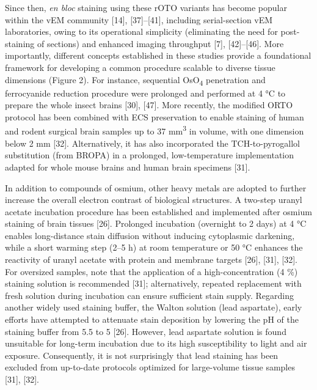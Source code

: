 \documentclass{article}
\begin{document}
Since then, \emph{en bloc} staining using these rOTO variants has become popular within the vEM community [14], [37]–[41], including serial-section vEM laboratories, owing to its operational simplicity (eliminating the need for post-staining of sections) and enhanced imaging throughput [7], [42]–[46]. More importantly, different concepts established in these studies provide a foundational framework for developing a common procedure scalable to diverse tissue dimensions (Figure 2). For instance, sequential OsO\textsubscript{4} penetration and ferrocyanide reduction procedure were prolonged and performed at 4 °C to prepare the whole insect brains [30], [47]. More recently, the modified ORTO protocol has been combined with ECS preservation to enable staining of human and rodent surgical brain samples up to 37 mm\textsuperscript{3} in volume, with one dimension below 2 mm [32]. Alternatively, it has also incorporated the TCH-to-pyrogallol substitution (from BROPA) in a prolonged, low-temperature implementation adapted for whole mouse brains and human brain specimens [31].

In addition to compounds of osmium, other heavy metals are adopted to further increase the overall electron contrast of biological structures. A two-step uranyl acetate incubation procedure has been established and implemented after osmium staining of brain tissues [26]. Prolonged incubation (overnight to 2 days) at 4 °C enables long-distance stain diffusion without inducing cytoplasmic darkening, while a short warming step (2–5 h) at room temperature or 50 °C enhances the reactivity of uranyl acetate with protein and membrane targets [26], [31], [32]. For oversized samples, note that the application of a high-concentration (4 \%) staining solution is recommended [31]; alternatively, repeated replacement with fresh solution during incubation can ensure sufficient stain supply. Regarding another widely used staining buffer, the Walton solution (lead aspartate), early efforts have attempted to attenuate stain deposition by lowering the pH of the staining buffer from 5.5 to 5 [26]. However, lead aspartate solution is found unsuitable for long-term incubation due to its high susceptibility to light and air exposure. Consequently, it is not surprisingly that lead staining has been excluded from up-to-date protocols optimized for large-volume tissue samples [31], [32].
\end{document}

